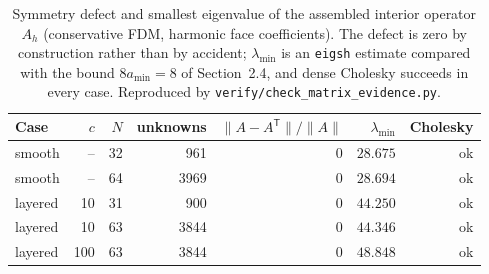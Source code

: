 \documentclass[11pt,a4paper]{article}
\theoremstyle{definition}
\theoremstyle{remark}
\begin{document}
\begin{table}[H]
\centering\small
\caption{Symmetry defect and smallest eigenvalue of the assembled interior
operator $A_h$ (conservative FDM, harmonic face coefficients). The defect is
zero by construction rather than by accident; $\lambda_{\min}$ is an
\texttt{eigsh} estimate compared with the bound $8a_{\min}=8$ of
Section~2.4, and dense Cholesky succeeds in every case. Reproduced by
\texttt{verify/check\_matrix\_evidence.py}.}
\label{tab:matrix_evidence}
\begin{tabular}{@{}lrrrrrr@{}}
\toprule
Case & $c$ & $N$ & unknowns & $\|A-A^{\mathsf T}\|/\|A\|$ & $\lambda_{\min}$ & Cholesky \\
\midrule
smooth  & -- & 32 & 961  & $0$ & $28.675$ & ok \\
smooth  & -- & 64 & 3969 & $0$ & $28.694$ & ok \\
layered & 10  & 31 & 900  & $0$ & $44.250$ & ok \\
layered & 10  & 63 & 3844 & $0$ & $44.346$ & ok \\
layered & 100 & 63 & 3844 & $0$ & $48.848$ & ok \\
\bottomrule
\end{tabular}
\end{table}

\newpage

\newpage






\clearpage
\def\reportbuild{}
\appendix

\end{document}

